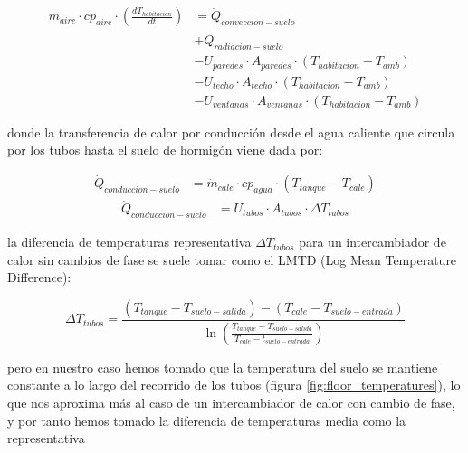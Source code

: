 \begin{align} \label{eq:room_energy_conservation}
	m_{aire} \cdot cp_{aire} \cdot \left( \frac{dT_{habitacion}}{dt} \right) & = \dot{Q}_{conveccion-suelo} \nonumber                                       \\
	                                                                         & + \dot{Q}_{radiacion-suelo} \nonumber                                        \\
	                                                                         & - U_{paredes} \cdot A_{paredes} \cdot (T_{habitacion} - T_{amb}) \nonumber   \\
	                                                                         & - U_{techo} \cdot A_{techo} \cdot (T_{habitacion} - T_{amb}) \nonumber       \\
	                                                                         & - U_{ventanas} \cdot A_{ventanas} \cdot (T_{habitacion} - T_{amb})
\end{align}

donde la transferencia de calor por conducción desde el agua caliente que
circula por los tubos hasta el suelo de hormigón viene dada por:

\begin{align} \label{eq:q_conduccion_1}
	\dot{Q}_{conduccion-suelo} & = \dot{m}_{cale} \cdot cp_{agua} \cdot (T_{tanque} - T_{cale})
\end{align}
\begin{align} \label{eq:q_conduccion_2}
	\dot{Q}_{conduccion-suelo} & = U_{tubos} \cdot A_{tubos} \cdot \Delta T_{tubos}
\end{align}

la diferencia de temperaturas representativa $\Delta T_{tubos}$ para un
intercambiador de calor sin cambios de fase se suele tomar como el LMTD (Log
Mean Temperature Difference):

\begin{equation} \label{eq:lmtd}
	\Delta T_{tubos} = \frac{(T_{tanque} - T_{suelo-salida}) - (T_{cale} - T_{suelo-entrada})}{\ln\left(\frac{T_{tanque} - T_{suelo-salida}}{T_{cale} - t_{suelo-entrada} } \right) }
\end{equation}

pero en nuestro caso hemos tomado que la temperatura del suelo se mantiene
constante a lo largo del recorrido de los tubos (figura
\ref{fig:floor_temperatures}), lo que nos aproxima más al caso de un
intercambiador de calor con cambio de fase, y por tanto hemos tomado la
diferencia de temperaturas media como la representativa


